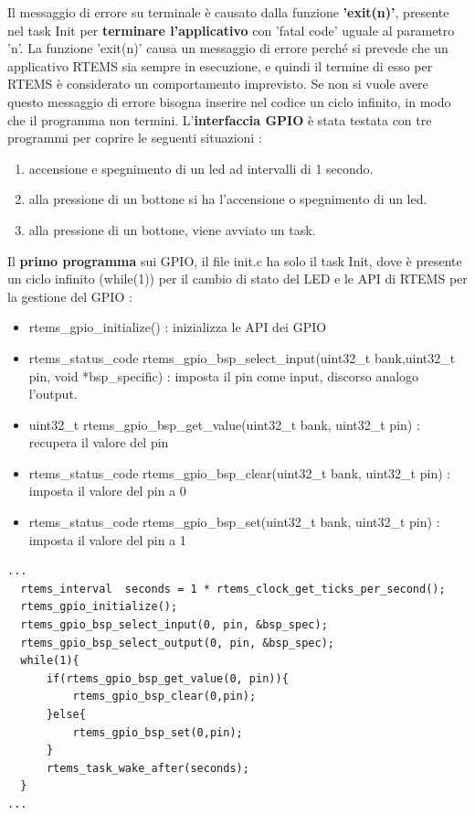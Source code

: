 \documentclass[12pt, a4paper, titlepage, oneside]{book}
\begin{document}
\begin{flushleft}
Il messaggio di errore su terminale è causato dalla funzione \textbf{'exit(n)'}, presente nel task Init per \textbf{terminare l'applicativo} con 'fatal code' uguale al parametro 'n'.
La funzione 'exit(n)' causa un messaggio di errore perché si prevede che un applicativo RTEMS sia sempre in esecuzione, e quindi il termine di esso per RTEMS è considerato un comportamento imprevisto.
Se non si vuole avere questo messaggio di errore bisogna inserire nel codice un ciclo infinito, in modo che il programma non termini.
\newpage
L'\textbf{interfaccia GPIO }è stata testata con tre programmi per coprire le seguenti situazioni :
\begin{enumerate}
    \item accensione e spegnimento di un led ad intervalli di 1 secondo.
    \item alla pressione di un bottone si ha l'accensione o spegnimento di un led.
    \item alla pressione di un bottone, viene avviato un task.
\end{enumerate}

Il \textbf{primo programma} sui GPIO, il file init.c ha solo il task Init, dove è presente un ciclo infinito (while(1)) per il cambio di stato del LED e le API di RTEMS per la gestione del GPIO :
\begin{itemize}
    \item rtems\_gpio\_initialize() : inizializza le API dei GPIO
    \item rtems\_status\_code rtems\_gpio\_bsp\_select\_input(uint32\_t bank,uint32\_t pin,  void *bsp\_specific) : imposta il pin come input, discorso analogo l'output.
    \item uint32\_t rtems\_gpio\_bsp\_get\_value(uint32\_t bank, uint32\_t pin) : recupera il valore del pin
    \item rtems\_status\_code rtems\_gpio\_bsp\_clear(uint32\_t bank, uint32\_t pin) : imposta il valore del pin a 0
    \item rtems\_status\_code rtems\_gpio\_bsp\_set(uint32\_t bank, uint32\_t pin) : imposta il valore del pin a 1
\end{itemize}
\begin{lstlisting}[style = CStyle]
  ...
  rtems_interval  seconds = 1 * rtems_clock_get_ticks_per_second();
  rtems_gpio_initialize();
  rtems_gpio_bsp_select_input(0, pin, &bsp_spec);
  rtems_gpio_bsp_select_output(0, pin, &bsp_spec);
  while(1){
	  if(rtems_gpio_bsp_get_value(0, pin)){
		  rtems_gpio_bsp_clear(0,pin);
	  }else{
		  rtems_gpio_bsp_set(0,pin);
	  }
	  rtems_task_wake_after(seconds);
  }
...


\end{lstlisting}
\end{flushleft}
\end{document}
